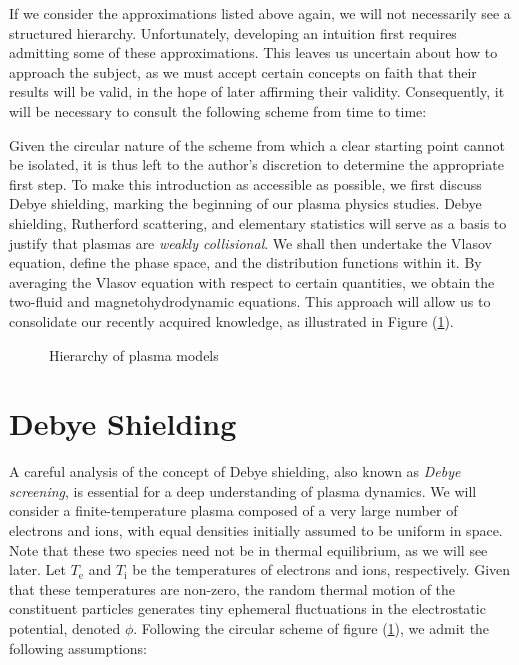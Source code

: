 If we consider the approximations listed above again, we will not necessarily see a structured hierarchy. Unfortunately, developing an intuition first requires admitting some of these approximations. This leaves us uncertain about how to approach the subject, as we must accept certain concepts on faith that their results will be valid, in the hope of later affirming their validity. Consequently, it will be necessary to consult the following scheme from time to time:

\vspace*{2.5pt}

\quad Given the circular nature of the scheme from which a clear starting point cannot be isolated, it is thus left to the author's discretion to determine the appropriate first step. To make this introduction as accessible as possible, we first discuss Debye shielding, marking the beginning of our plasma physics studies. Debye shielding, Rutherford scattering, and elementary statistics will serve as a basis to justify that plasmas are \textit{weakly collisional}. We shall then undertake the Vlasov equation, define the phase space, and the distribution functions within it. By averaging the Vlasov equation with respect to certain quantities, we obtain the two-fluid and magnetohydrodynamic equations. This approach will allow us to consolidate our recently acquired knowledge, as illustrated in Figure (\ref{fig1-2}).

\begin{figure}[H]
    \centering
    \scalebox{0.8}{}
    \caption{Hierarchy of plasma models}
    \label{fig1-2}
\end{figure}

\section{Debye Shielding}

A careful analysis of the concept of Debye shielding, also known as \textit{Debye screening}, is essential for a deep understanding of plasma dynamics. We will consider a finite-temperature plasma composed of a very large number of electrons and ions, with equal densities initially assumed to be uniform in space. Note that these two species need not be in thermal equilibrium, as we will see later. Let $T_\text{e}$ and $T_\mathrm{i}$ be the temperatures of electrons and ions, respectively. Given that these temperatures are non-zero, the random thermal motion of the constituent particles generates tiny ephemeral fluctuations in the electrostatic potential, denoted $\phi$. Following the circular scheme of figure (\ref{fig1-2}), we admit the following assumptions:

